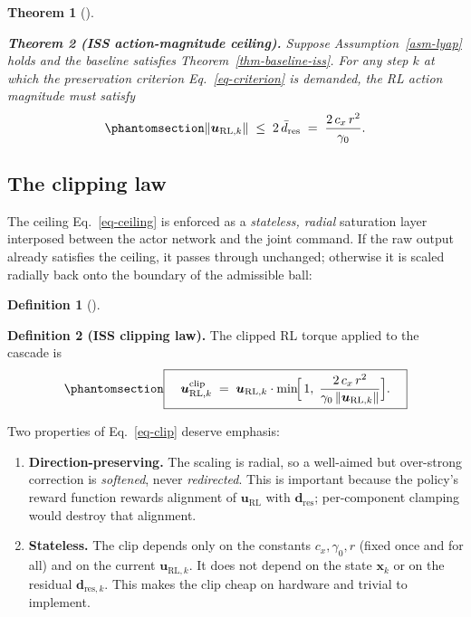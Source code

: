 \documentclass[
  11pt,
]{article}
\theoremstyle{plain}
\theoremstyle{plain}
\newtheorem{theorem}{Theorem}[section]
\theoremstyle{definition}
\newtheorem{definition}{Definition}[section]
\theoremstyle{remark}
\begin{document}
\begin{theorem}[]\protect\hypertarget{thm-ceiling}{}\label{thm-ceiling}

\textbf{Theorem 2 (ISS action-magnitude ceiling).} Suppose
Assumption~\ref{asm-lyap} holds and the baseline satisfies
Theorem~\ref{thm-baseline-iss}. For any step \(k\) at which the
preservation criterion Eq.~\ref{eq-criterion} is demanded, the RL action
magnitude must satisfy
\begin{equation}\protect\phantomsection\label{eq-ceiling}{
\|\bm{u}_{\mathrm{RL},k}\|
\;\le\;
2\,\bar{d}_{\mathrm{res}}
\;=\;
\frac{2\,c_x\,r^2}{\gamma_0}.
}\end{equation}

\end{theorem}

\subsection{The clipping law}\label{sec-cliplaw}

The ceiling Eq.~\ref{eq-ceiling} is enforced as a \emph{stateless,
radial} saturation layer interposed between the actor network and the
joint command. If the raw output already satisfies the ceiling, it
passes through unchanged; otherwise it is scaled radially back onto the
boundary of the admissible ball:

\begin{definition}[]\protect\hypertarget{def-clip}{}\label{def-clip}

\textbf{Definition 2 (ISS clipping law).} The clipped RL torque applied
to the cascade is
\begin{equation}\protect\phantomsection\label{eq-clip}{
\boxed{\quad
\bm{u}_{\mathrm{RL},k}^{\mathrm{clip}}
\;=\;
\bm{u}_{\mathrm{RL},k}\cdot
\min\!\Bigl[\,1,\;
\frac{2\,c_x\,r^2}{\gamma_0\,\|\bm{u}_{\mathrm{RL},k}\|}
\Bigr].
\quad}
}\end{equation}

\end{definition}

Two properties of Eq.~\ref{eq-clip} deserve emphasis:

\begin{enumerate}
\def\labelenumi{\arabic{enumi}.}
\item
  \textbf{Direction-preserving.} The scaling is radial, so a well-aimed
  but over-strong correction is \emph{softened}, never
  \emph{redirected}. This is important because the policy's reward
  function rewards alignment of \(\bm{u}_{\mathrm{RL}}\) with
  \(\bm{d}_{\mathrm{res}}\); per-component clamping would destroy that
  alignment.
\item
  \textbf{Stateless.} The clip depends only on the constants
  \(c_x,\gamma_0,r\) (fixed once and for all) and on the current
  \(\bm{u}_{\mathrm{RL},k}\). It does not depend on the state
  \(\bm{x}_k\) or on the residual \(\bm{d}_{\mathrm{res},k}\). This
  makes the clip cheap on hardware and trivial to implement.
\end{enumerate}
\end{document}
